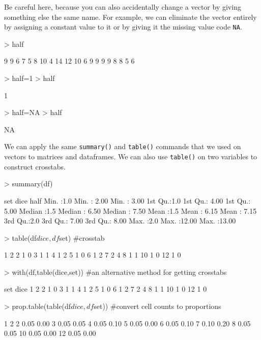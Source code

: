 \documentclass[12pt]{article}
\begin{document}
Be careful here, because you can also accidentally change a vector by giving something else the same name. For example, we can eliminate the vector entirely by assigning a constant value to it or by giving it the missing value code \verb|NA|.
\begin{Schunk}
\begin{Sinput}
> half
\end{Sinput}
\begin{Soutput}
 [1]  9  9  6  7  5  8 10  4 14 12 10  6  9  9  9  9  8  8  5  6
\end{Soutput}
\begin{Sinput}
> half=1
> half
\end{Sinput}
\begin{Soutput}
[1] 1
\end{Soutput}
\begin{Sinput}
> half=NA
> half
\end{Sinput}
\begin{Soutput}
[1] NA
\end{Soutput}
\end{Schunk}

We can apply the same \verb|summary()| and \verb|table()| commands that we used on vectors to matrices and dataframes. We can also use \verb|table()| on two variables to construct crosstabs.
\begin{Schunk}
\begin{Sinput}
> summary(df)
\end{Sinput}
\begin{Soutput}
      set           dice            half      
 Min.   :1.0   Min.   : 2.00   Min.   : 3.00  
 1st Qu.:1.0   1st Qu.: 4.00   1st Qu.: 5.00  
 Median :1.5   Median : 6.50   Median : 7.50  
 Mean   :1.5   Mean   : 6.15   Mean   : 7.15  
 3rd Qu.:2.0   3rd Qu.: 7.00   3rd Qu.: 8.00  
 Max.   :2.0   Max.   :12.00   Max.   :13.00  
\end{Soutput}
\begin{Sinput}
> table(df$dice,df$set) #crosstab
\end{Sinput}
\begin{Soutput}
     1 2
  2  1 0
  3  1 1
  4  1 2
  5  1 0
  6  1 2
  7  2 4
  8  1 1
  10 1 0
  12 1 0
\end{Soutput}
\begin{Sinput}
> with(df,table(dice,set)) #an alternative method for getting crosstabs
\end{Sinput}
\begin{Soutput}
    set
dice 1 2
  2  1 0
  3  1 1
  4  1 2
  5  1 0
  6  1 2
  7  2 4
  8  1 1
  10 1 0
  12 1 0
\end{Soutput}
\begin{Sinput}
> prop.table(table(df$dice,df$set)) #convert cell counts to proportions
\end{Sinput}
\begin{Soutput}
        1    2
  2  0.05 0.00
  3  0.05 0.05
  4  0.05 0.10
  5  0.05 0.00
  6  0.05 0.10
  7  0.10 0.20
  8  0.05 0.05
  10 0.05 0.00
  12 0.05 0.00
\end{Soutput}
\end{Schunk}
\end{document}
